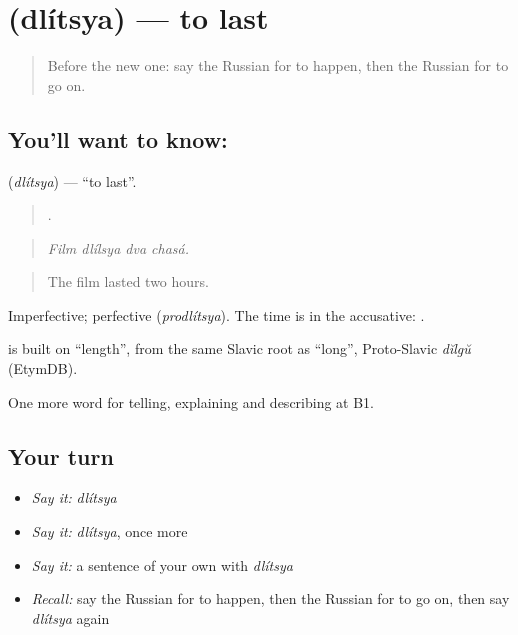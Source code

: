 \section[\texorpdfstring{\ru{длиться} (dlítsya)}{длиться (dlítsya)}]{ (dlítsya) — to last}

\label{lesson:RU-C273-dlitsya}



\begin{quote}
Before the new one: say the Russian for to happen, then the Russian for to go on.
\end{quote}

\subsection*{You'll want to know: }
\textbf{} (\emph{dlítsya}) — \textquotedblleft{}to last\textquotedblright{}.

\begin{quote}
   .
\end{quote}

\begin{quote}
\emph{Film dlílsya dva chasá.}
\end{quote}

\begin{quote}
The film lasted two hours.
\end{quote}

Imperfective; perfective \emph{} (\emph{prodlítsya}). The time is in the accusative: \emph{  }.

\begin{cousinweb}
\emph{} is built on \emph{} \textquotedblleft{}length\textquotedblright{}, from the same Slavic root as \emph{} \textquotedblleft{}long\textquotedblright{}, Proto-Slavic \emph{dĭlgŭ} (EtymDB).
\end{cousinweb}

\begin{grammarlens}[title={What you've built}]
One more word for telling, explaining and describing at B1.
\end{grammarlens}

\subsection*{Your turn}
\begin{itemize}
\raggedright
  \item \emph{Say it:} \emph{dlítsya}
  \item \emph{Say it:} \emph{dlítsya}, once more
  \item \emph{Say it:} a sentence of your own with \emph{dlítsya}
  \item \emph{Recall:} say the Russian for to happen, then the Russian for to go on, then say \emph{dlítsya} again
\end{itemize}

